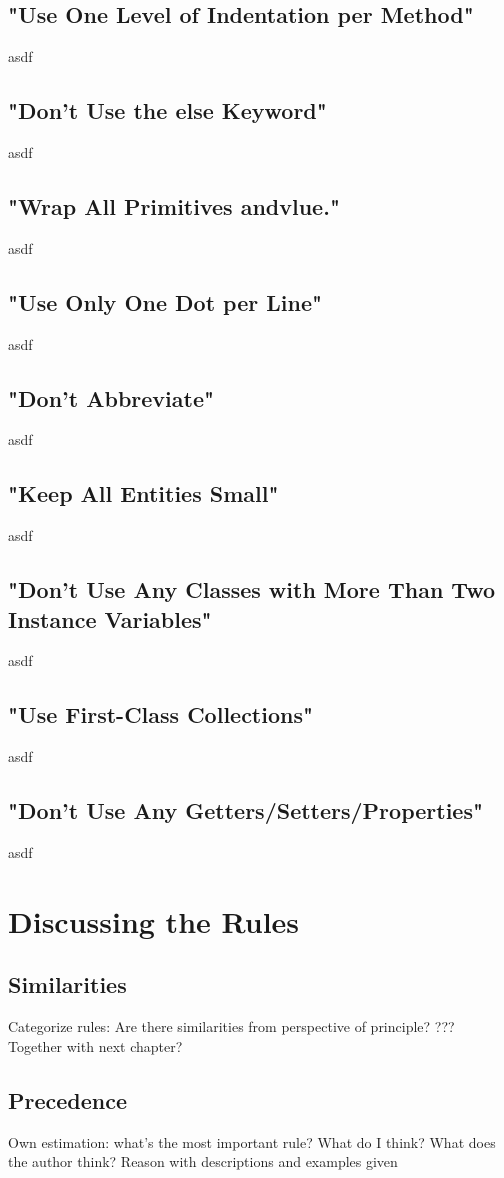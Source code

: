 \subsection{"Use One Level of Indentation per Method"}
asdf
\subsection{"Don’t Use the else Keyword"}
asdf
\subsection{"Wrap All Primitives andvlue."}
asdf
\subsection{"Use Only One Dot per Line"}
asdf
\subsection{"Don't Abbreviate"}
asdf
\subsection{"Keep All Entities Small"}
asdf
\subsection{"Don’t Use Any Classes with More Than Two Instance Variables"}
asdf
\subsection{"Use First-Class Collections"}
asdf
\subsection{"Don’t Use Any Getters/Setters/Properties"}
asdf
\section{Discussing the Rules}
\subsection{Similarities}
Categorize rules: Are there similarities from perspective of principle? ??? Together with next chapter?
\subsection{Precedence}
Own estimation: what's the most important rule? What do I think? What does the author think? Reason with descriptions and examples given
